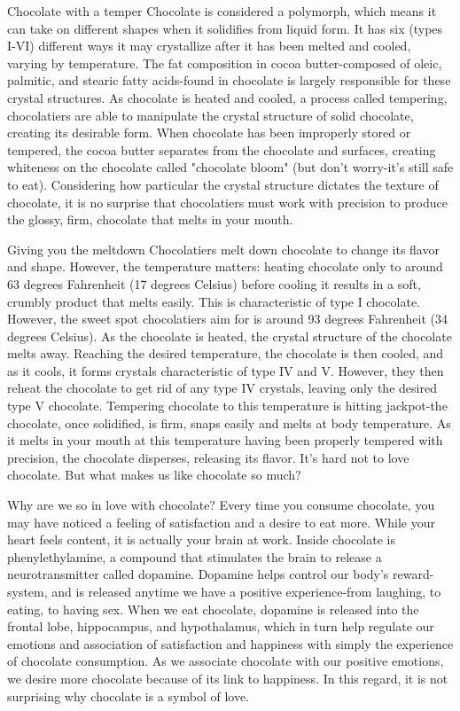 \documentclass{book}\usepackage[]{graphicx}\usepackage[]{color}
\begin{document}
Chocolate with a temper
Chocolate is considered a polymorph, which means it can take on different shapes when it solidifies from liquid form. It has six (types I-VI) different ways it may crystallize after it has been melted and cooled, varying by temperature. The fat composition in cocoa butter-composed of oleic, palmitic, and stearic fatty acids-found in chocolate is largely responsible for these crystal structures. As chocolate is heated and cooled, a process called tempering, chocolatiers are able to manipulate the crystal structure of solid chocolate, creating its desirable form. When chocolate has been improperly stored or tempered, the cocoa butter separates from the chocolate and surfaces, creating whiteness on the chocolate called "chocolate bloom" (but don't worry-it's still safe to eat). Considering how particular the crystal structure dictates the texture of chocolate, it is no surprise that chocolatiers must work with precision to produce the glossy, firm, chocolate that melts in your mouth.

Giving you the meltdown 
Chocolatiers melt down chocolate to change its flavor and shape. However, the temperature matters: heating chocolate only to around 63 degrees Fahrenheit (17 degrees Celsius) before cooling it results in a soft, crumbly product that melts easily. This is characteristic of type I chocolate. However, the sweet spot chocolatiers aim for is around 93 degrees Fahrenheit (34 degrees Celsius). As the chocolate is heated, the crystal structure of the chocolate melts away. Reaching the desired temperature, the chocolate is then cooled, and as it cools, it forms crystals characteristic of type IV and V. However, they then reheat the chocolate to get rid of any type IV crystals, leaving only the desired type V chocolate. Tempering chocolate to this temperature is hitting jackpot-the chocolate, once solidified, is firm, snaps easily and melts at body temperature. As it melts in your mouth at this temperature having been properly tempered with precision, the chocolate disperses, releasing its flavor. It's hard not to love chocolate. But what makes us like chocolate so much?

Why are we so in love with chocolate? 
Every time you consume chocolate, you may have noticed a feeling of satisfaction and a desire to eat more. While your heart feels content, it is actually your brain at work. Inside chocolate is phenylethylamine, a compound that stimulates the brain to release a neurotransmitter called dopamine. Dopamine helps control our body's reward-system, and is released anytime we have a positive experience-from laughing, to eating, to having sex. When we eat chocolate, dopamine is released into the frontal lobe, hippocampus, and hypothalamus, which in turn help regulate our emotions and association of satisfaction and happiness with simply the experience of chocolate consumption. As we associate chocolate with our positive emotions, we desire more chocolate because of its link to happiness. In this regard, it is not surprising why chocolate is a symbol of love.
\end{document}
